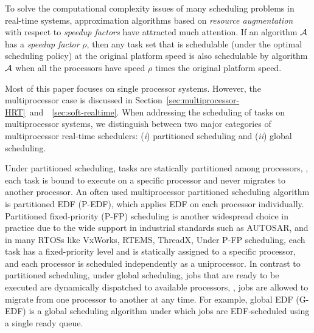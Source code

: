 To solve the computational complexity issues of many scheduling problems in real-time systems, approximation algorithms based on \textit{resource augmentation} with respect to \emph{speedup factors} have attracted much attention.  If an algorithm ${\cal A}$ has a \emph{speedup factor} $\rho$, then any task set that is schedulable (under the optimal scheduling policy) at the original platform speed is also schedulable by algorithm ${\cal A}$ when all the processors have speed $\rho$ times the original platform speed.




Most of this paper focuses on single processor systems. However, the multiprocessor case is discussed in Section~\ref{sec:multiprocessor-HRT}~and~\mysectionref{}~\ref{sec:soft-realtime}. When addressing the scheduling of tasks on multiprocessor systems, we distinguish between two major categories of multiprocessor real-time schedulers:  (\textit{i}) partitioned scheduling and (\textit{ii}) global scheduling. 

Under partitioned scheduling, tasks are statically partitioned among processors, \ie, each task is bound to execute on a specific processor and never migrates to another processor. An often used multiprocessor partitioned scheduling algorithm is partitioned EDF (P-EDF), which applies EDF on each processor individually.
Partitioned fixed-priority (P-FP) scheduling is another widespread
choice in practice due to the wide support in industrial standards
such as AUTOSAR, and in many RTOSs like VxWorks, RTEMS, ThreadX, \etc
Under P-FP scheduling, each task has a fixed-priority level and is statically assigned to a specific processor, and each processor is scheduled independently as a uniprocessor.  
 In contrast to partitioned scheduling, under global scheduling, jobs that are ready to be executed are dynamically dispatched to available processors, \ie, jobs are allowed to migrate from one processor to another at any time. For example, global EDF (G-EDF) is a global scheduling algorithm under which jobs are EDF-scheduled using a single ready queue.

